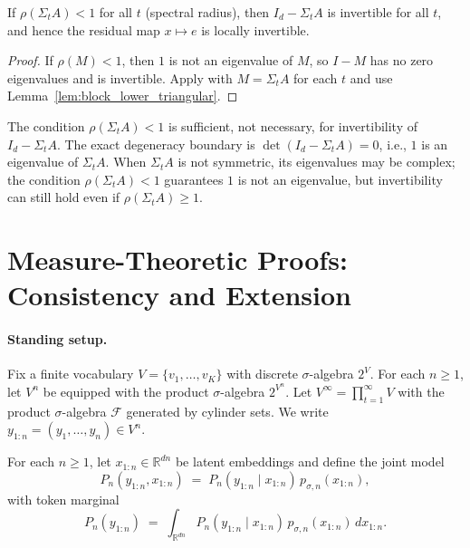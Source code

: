 \documentclass[11pt]{article}
\begin{document}
\begin{lemma}
\label{lem:spectral_sufficient}
If $\rho(\Sigma_tA)<1$ for all $t$ (spectral radius), then $I_d-\Sigma_tA$ is invertible for all $t$,
and hence the residual map $x\mapsto e$ is locally invertible.
\end{lemma}

\begin{proof}
If $\rho(M)<1$, then $1$ is not an eigenvalue of $M$, so $I-M$ has no zero eigenvalues and is invertible.
Apply with $M=\Sigma_tA$ for each $t$ and use Lemma~\ref{lem:block_lower_triangular}.
\end{proof}

\begin{remark}
The condition $\rho(\Sigma_tA)<1$ is sufficient, not necessary, for invertibility of $I_d-\Sigma_tA$.
The exact degeneracy boundary is $\det(I_d-\Sigma_tA)=0$, i.e., $1$ is an eigenvalue of $\Sigma_tA$.
When $\Sigma_tA$ is not symmetric, its eigenvalues may be complex; the condition $\rho(\Sigma_tA)<1$
guarantees $1$ is not an eigenvalue, but invertibility can still hold even if $\rho(\Sigma_tA)\ge 1$.
\end{remark}


\section{Measure-Theoretic Proofs: Consistency and Extension}
\label{app:kolmogorov_proofs}

\paragraph{Standing setup.}
Fix a finite vocabulary $V=\{v_1,\dots,v_K\}$ with discrete $\sigma$-algebra $2^V$.
For each $n\ge 1$, let $V^n$ be equipped with the product $\sigma$-algebra $2^{V^n}$.
Let $V^\infty=\prod_{t=1}^\infty V$ with the product $\sigma$-algebra $\mathcal F$ generated by cylinder sets.
We write $y_{1:n}=(y_1,\dots,y_n)\in V^n$.

For each $n\ge 1$, let $x_{1:n}\in\mathbb R^{dn}$ be latent embeddings and define the joint model
\begin{equation}
P_n(y_{1:n},x_{1:n})
\;=\;
P_n(y_{1:n}\mid x_{1:n})\,p_{\sigma,n}(x_{1:n}),
\label{eq:appendix_joint_n}
\end{equation}
with token marginal
\begin{equation}
P_n(y_{1:n})
\;=\;
\int_{\mathbb R^{dn}} P_n(y_{1:n}\mid x_{1:n})\,p_{\sigma,n}(x_{1:n})\,dx_{1:n}.
\label{eq:appendix_marginal_n}
\end{equation}
\end{document}
